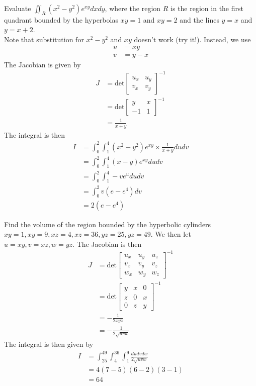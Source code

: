 \documentclass[12pt]{article}
\begin{document}
\begin{ex}
	Evaluate $\iint_R(x^2-y^2)e^{xy}dxdy$, where the region $R$ is the region in the first quadrant bounded by the hyperbolas $xy=1$ and $xy=2$ and the lines $y=x$ and $y=x+2$. \\
	Note that substitution for $x^2-y^2$ and $xy$ doesn't work (try it!). Instead, we use
	\begin{align*}
		u &= xy \\
		v &= y-x
	\end{align*}
	The Jacobian is given by
	\begin{align*}
		J &= \text{det} \begin{bmatrix} u_x & u_y \\ v_x & v_y \end{bmatrix}^{-1} \\
		  &= \text{det} \begin{bmatrix} y & x \\ -1 & 1 \end{bmatrix}^{-1} \\
		  &= \frac{1}{x+y}
	\end{align*}
	The integral is then
	\begin{align*}
		I &= \int_0^2 \int_1^4 (x^2-y^2)e^{xy} \times \frac{1}{x+y}dudv \\
		  &= \int_0^2 \int_1^4 (x-y)e^{xy} dudv \\
		  &= \int_0^2 \int_1^4 -ve^u dudv \\
		  &= \int_0^2 v(e-e^4) dv \\
		  &= 2(e-e^4)
	\end{align*}
\end{ex}

\begin{ex}
	Find the volume of the region bounded by the hyperbolic cylinders $xy=1, xy=9, xz=4, xz=36, yz=25,yz=49$. We then let $u=xy, v=xz, w=yz$. The Jacobian is then
	\begin{align*}
		J &= \text{det} \begin{bmatrix} u_x & u_y & u_z \\ v_x & v_y & v_z \\ w_x & w_y & w_z \end{bmatrix}^{-1} \\
		  &= \text{det} \begin{bmatrix} y & x & 0 \\ z & 0 & x \\ 0 & z & y \end{bmatrix}^{-1} \\
		  &= -\frac{1}{2xyz} \\
		  &= -\frac{1}{2\sqrt{uvw}}
	\end{align*}
The integral is then given by
\begin{align*}
	I &= \int_{25}^{49} \int_4^{36} \int_1^9 \frac{dudvdw}{2\sqrt{uvw}} \\
	  &= 4(7-5)(6-2)(3-1) \\
	  &= 64
\end{align*}
\end{ex}
\end{document}
